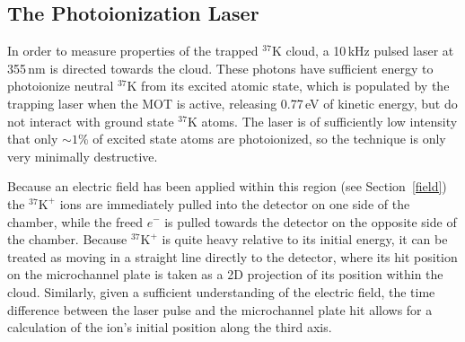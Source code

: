 \subsection{The Photoionization Laser}
\label{cloud}
\label{photoions}

In order to measure properties of the trapped $^{37}\textrm{K}$ cloud, a 10\,kHz pulsed laser at 355\,nm is directed towards the cloud.  These photons have sufficient energy to photoionize neutral $^{37}\textrm{K}$ from its excited atomic state, which is populated by the trapping laser when the MOT is active, releasing 0.77\,eV of kinetic energy, but do not interact with ground state $^{37}\textrm{K}$ atoms.  The laser is of sufficiently low intensity that only $\sim 1\%$ of excited state atoms are photoionized, so the technique is only very minimally destructive.


Because an electric field has been applied within this region (see Section~\ref{field}) the $^{37}\textrm{K}^+$ ions are immediately pulled into the detector on one side of the chamber, while the freed $e^-$ is pulled towards the detector on the opposite side of the chamber.  Because  $^{37}\textrm{K}^+$ is quite heavy relative to its initial energy, it can be treated as moving in a straight line directly to the detector, where its hit position on the microchannel plate is taken as a 2D projection of its position within the cloud.  Similarly, given a sufficient understanding of the electric field, the time difference between the laser pulse and the microchannel plate hit allows for a calculation of the ion's initial position along the third axis.  

